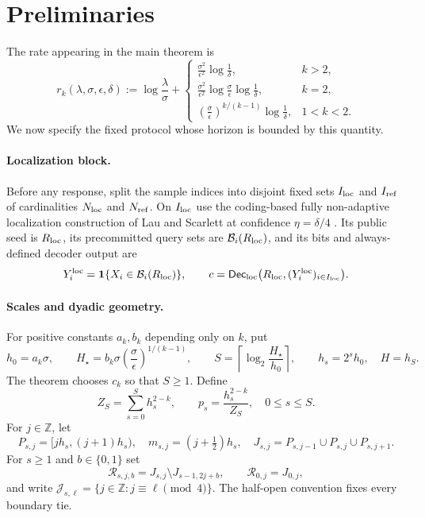 \section{Preliminaries}\label{sec:preliminaries}

The rate appearing in the main theorem is
\[
r_k(\lambda,\sigma,\epsilon,\delta)
:=\log\frac{\lambda}{\sigma}+
\begin{cases}
\displaystyle \frac{\sigma^2}{\epsilon^2}\log\frac1\delta,
  & k>2,\\[0.6em]
\displaystyle \frac{\sigma^2}{\epsilon^2}
  \log\frac{\sigma}{\epsilon}\log\frac1\delta,
  & k=2,\\[0.6em]
\displaystyle \left(\frac{\sigma}{\epsilon}\right)^{k/(k-1)}
  \log\frac1\delta,
  & 1<k<2.
\end{cases}
\]
We now specify the fixed protocol whose horizon is bounded by this quantity.

\paragraph{Localization block.}
Before any response, split the sample indices into disjoint fixed sets
$I_{\rm loc}$ and $I_{\rm ref}$ of cardinalities $N_{\rm loc}$ and
$N_{\rm ref}$.  On $I_{\rm loc}$ use the coding-based fully non-adaptive
localization construction of Lau and Scarlett at confidence
$\eta=\delta/4$ \citep[Theorem~16 and Appendix~``Two-stage
estimator'']{lau-scarlett-2026}.  Its public seed is $R_{\rm loc}$, its
precommitted query sets are $\mathcal B_i(R_{\rm loc})$, and its bits and
always-defined decoder output are
\[
Y_i^{\rm loc}=\mathbf 1\{X_i\in\mathcal B_i(R_{\rm loc})\},\qquad
c=\mathsf{Dec}_{\rm loc}
 \bigl(R_{\rm loc},(Y_i^{\rm loc})_{i\in I_{\rm loc}}\bigr).
\]

\paragraph{Scales and dyadic geometry.}
For positive constants $a_k,b_k$ depending only on $k$, put
\[
h_0=a_k\sigma,\qquad
H_\star=b_k\sigma\left(\frac\sigma\epsilon\right)^{1/(k-1)},
\qquad
S=\left\lceil\log_2\frac{H_\star}{h_0}\right\rceil,
\qquad h_s=2^sh_0,\quad H=h_S.
\]
The theorem chooses $c_k$ so that $S\geq1$.  Define
\[
Z_S=\sum_{s=0}^S h_s^{2-k},\qquad
p_s=\frac{h_s^{2-k}}{Z_S},\quad 0\leq s\leq S.
\]
For $j\in\mathbb Z$, let
\[
P_{s,j}=[jh_s,(j+1)h_s),\quad
m_{s,j}=(j+\tfrac12)h_s,\quad
J_{s,j}=P_{s,j-1}\cup P_{s,j}\cup P_{s,j+1}.
\]
For $s\geq1$ and $b\in\{0,1\}$ set
\[
\mathcal R_{s,j,b}=J_{s,j}\setminus J_{s-1,2j+b},
\qquad \mathcal R_{0,j}=J_{0,j},
\]
and write $\mathcal J_{s,\ell}=\{j\in\mathbb Z:j\equiv\ell\pmod4\}$.
The half-open convention fixes every boundary tie.

